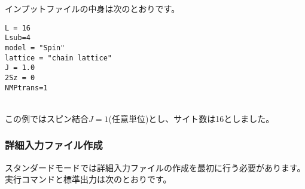 インプットファイルの中身は次のとおりです。
\\
\begin{minipage}{10cm}
\begin{screen}
\begin{verbatim}
L = 16
Lsub=4
model = "Spin"
lattice = "chain lattice"
J = 1.0
2Sz = 0
NMPtrans=1
\end{verbatim}
\end{screen}
\end{minipage}
%
\\
この例ではスピン結合$J=1$(任意単位)とし、サイト数は16としました。

\subsubsection{詳細入力ファイル作成}
スタンダードモードでは詳細入力ファイルの作成を最初に行う必要があります。
実行コマンドと標準出力は次のとおりです。

